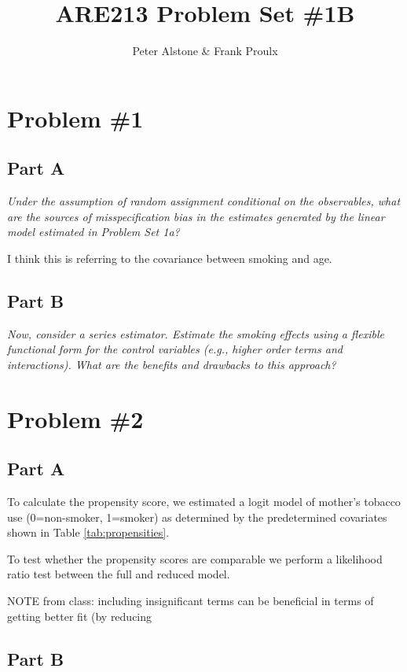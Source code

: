 \documentclass[letterpaper, 12pt]{article}
\begin{document}
\title{ARE213 Problem Set \#1B}
\author{Peter Alstone \& Frank Proulx}
\maketitle

\section{Problem \#1}
\subsection{Part A}
\emph{Under the assumption of random assignment conditional on the observables, what are the sources of misspecification bias in the estimates generated by the linear model estimated in Problem Set 1a?}

I think this is referring to the covariance between smoking and age.




\subsection{Part B}
\emph{Now, consider a series estimator. Estimate the smoking effects using a flexible functional form for the control variables (e.g., higher order terms and interactions). What are the benefits and drawbacks to this approach?}


\section{Problem \#2}
\subsection{Part A}

To calculate the propensity score, we estimated a logit model of mother's tobacco use (0=non-smoker, 1=smoker) as determined by the predetermined covariates shown in Table \ref{tab:propensities}.



To test whether the propensity scores are comparable we perform a likelihood ratio test between the full and reduced model. 

NOTE from class: including insignificant terms can be beneficial in terms of getting better fit (by reducing 



\subsection{Part B}
\end{document}

